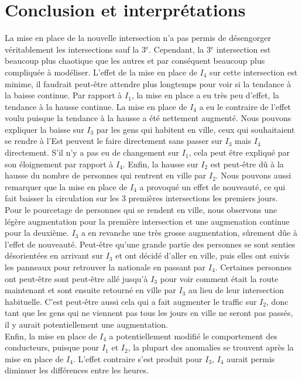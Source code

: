 \documentclass[titlepage]{article}
\begin{document}
\newpage
\section*{Conclusion et interprétations}

La mise en place de la nouvelle intersection n'a pas permis de désengorger véritablement les intersections sauf la 3$^{\text{e}}$. Cependant, la 3$^{\text{e}}$
intersection est beaucoup plus chaotique que les autres et par conséquent beaucoup plus compliquée à modéliser. L'effet de la mise en place de $I_4$ sur cette
intersection est minime, il faudrait peut-être attendre plus longtemps pour voir si la tendance à la baisse continue. Par rapport à $I_1$, la mise en place a eu
très peu d'effet, la tendance à la hausse continue. La mise en place de $I_4$ a eu le contraire de l'effet voulu puisque la tendance à la hausse a été
nettement augmenté. Nous pouvons expliquer la baisse sur $I_3$ par les gens qui habitent en ville, ceux qui souhaitaient se rendre à l'Est peuvent le faire
directement sans passer sur $I_3$ mais $I_4$ directement. S'il n'y a pas eu de changement sur $I_1$, cela peut être expliqué par son éloignement par
rapport à $I_4$. Enfin, la hausse sur $I_2$ est peut-être dû à la hausse du nombre de personnes qui rentrent en ville par $I_2$. Nous pouvons aussi
remarquer que la mise en place de $I_4$ a provoqué un effet de nouveauté, ce qui fait baisser la circulation sur les 3 premières intersections les premiers
jours.\\

Pour le pourcetage de personnes qui se rendent en ville, nous observons une légère augmentation pour la première intersection et une augmenation continue
pour la deuxième. $I_3$ a en revanche une très grosse augmentation, sûrement dûe à l'effet de nouveauté. Peut-être qu'une grande partie des personnes
se sont senties désorientées en arrivant sur $I_3$ et ont décidé d'aller en ville, puis elles ont suivis les panneaux pour retrouver la nationale en passant par
$I_4$. Certaines personnes ont peut-être sont peut-être allé jusqu'à $I_3$ pour voir comment était la route maintenant et sont ensuite retourné en ville par
$I_3$ au lieu de leur intersection habituelle. C'est peut-être aussi cela qui a fait augmenter le traffic sur $I_2$, donc tant que les gens qui ne viennent pas
tous les jours en ville ne seront pas passés, il y aurait potentiellement une augmentation.\\

Enfin, la mise en place de $I_4$ a potentiellement modifié le comportement des conducteurs, puisque pour $I_1$ et $I_2$, la plupart des anomalies se
trouvent après la mise en place de $I_4$. L'effet contraire s'est produit pour $I_3$, $I_4$ aurait permis diminuer les différences entre les heures.
\end{document}
